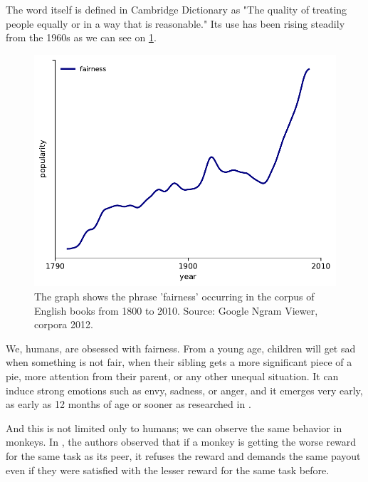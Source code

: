 
The word itself is defined in Cambridge Dictionary \cite{fairness_definition} as "The quality of treating people equally or in a way that is reasonable." Its use has been rising steadily from the 1960s as we can see on \ref{fig:popularity_of_fairness}.

\begin{figure}[htbp]
    \centering
    \includegraphics{img/google_ngram_fairness-eng_2012-1800-2000.pdf}
    \caption{The graph shows the phrase 'fairness' occurring in the corpus of English books from 1800 to 2010. Source: Google Ngram Viewer, corpora 2012. \cite{google_ngram_viewer_2012}}
    \label{fig:popularity_of_fairness}
\end{figure}

We, humans, are obsessed with fairness. From a young age, children will get sad when something is not fair, when their sibling gets a more significant piece of a pie, more attention from their parent, or any other unequal situation. It can induce strong emotions such as envy, sadness, or anger, and it emerges very early, as early as 12 months of age or sooner as researched in \cite{children_fairness}.

And this is not limited only to humans; we can observe the same behavior in monkeys. In \cite{brosnan2003monkeys}, the authors observed that if a monkey is getting the worse reward for the same task as its peer,  it refuses the reward and demands the same payout even if they were satisfied with the lesser reward for the same task before.

